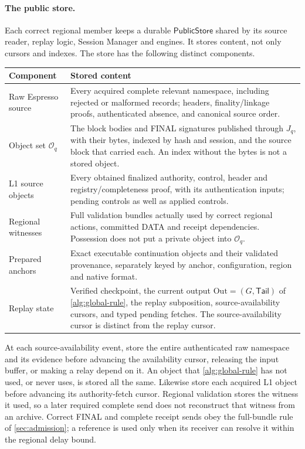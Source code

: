 \documentclass[11pt,a4paper]{article}
\newcommand{\tagg}[1]{\ensuremath{\mathsf{#1}}}
\begin{document}
\paragraph{The public store.}
Each correct regional member keeps a durable \tagg{PublicStore} shared
by its source reader, replay logic, Session Manager and engines. It stores content, not only cursors and indexes. The store
has the following distinct components.
\begin{table}[htbp]\centering\small
\begin{tabularx}{\linewidth}{@{}>{\raggedright\arraybackslash}p{.24\linewidth}Y@{}}\toprule
Component & Stored content\\\midrule
Raw Espresso source & Every acquired complete relevant namespace,
including rejected or malformed records; headers, finality/linkage
proofs, authenticated absence, and canonical source order.\\
Object set $\mathcal O_q$ & The block bodies and FINAL signatures
published through $J_q$, with their bytes, indexed by hash and session,
and the source block that carried each. An index without the bytes is
not a stored object.\\
L1 source objects & Every obtained finalized authority, control,
header and registry/completeness proof, with its authentication inputs;
pending controls as well as applied controls.\\
Regional witnesses & Full validation bundles actually used by correct
regional actions, committed DATA and receipt dependencies. Possession
does not put a private object into $\mathcal O_q$.\\
Prepared anchors & Exact executable continuation objects and their
validated provenance, separately keyed by anchor, configuration,
region and native format.\\
Replay state & Verified checkpoint, the current output
$\mathrm{Out}=(G,\mathsf{Tail})$ of \cref{alg:global-rule}, the replay subposition,
source-availability cursors, and typed pending fetches.
The source-availability cursor is distinct from the replay cursor.\\\bottomrule
\end{tabularx}
\end{table}

At each source-availability event, store the entire authenticated raw
namespace and its evidence before advancing the availability cursor,
releasing the input buffer, or making a relay depend on it. An object
that \cref{alg:global-rule} has not used, or never uses, is stored all
the same. Likewise store each acquired L1
object before advancing its authority-fetch cursor. Regional validation
stores the witness it used, so a later required complete send does not
reconstruct that witness from an archive. Correct FINAL and complete
receipt sends obey the full-bundle rule of \cref{sec:admission}; a
reference is used only when its receiver can resolve it within the
regional delay bound.
\end{document}
